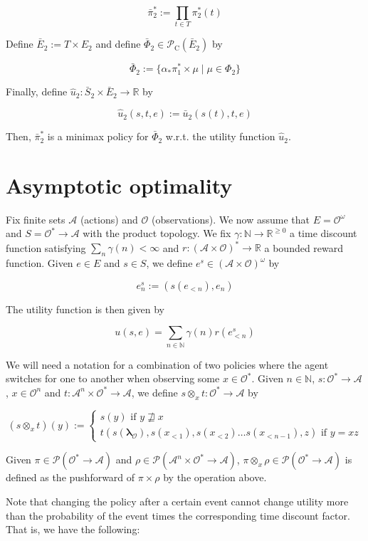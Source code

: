 \documentclass[a4paper]{article}
\newcommand{\Nats}{\mathbb{N}}
\newcommand{\Reals}{\mathbb{R}}
\newcommand{\Estr}{\bm{\lambda}}
\newcommand{\Prob}{\mathcal{P}}
\newcommand{\Act}{\mathcal{A}}
\newcommand{\Obs}{\mathcal{O}}
\newcommand{\ObsO}{\Obs^\omega}
\newcommand{\Pol}{\Obs^* \rightarrow \Act}
\newcommand{\CC}{\mathcal{P}_{\operatorname{C}}}
\begin{document}
$${\bar{\pi}_2^* := \prod_{t \in T} \pi_2^*(t)}$$

Define ${\bar{E}_2:=T \times E_2}$ and define ${\bar{\Phi}_2 \in \CC(\bar{E}_2)}$ by

$$\bar{\Phi}_2:=\{\alpha_* \pi_1^* \times \mu \mid \mu \in \Phi_2\}$$

Finally, define ${\hat{u}_2: \bar{S}_2 \times \bar{E}_2 \rightarrow \Reals}$ by

$$\hat{u}_2(s,t,e):=\bar{u}_2(s(t),t,e)$$

Then, ${\bar{\pi}_2^*}$ is a minimax policy for ${\bar{\Phi}_2}$ w.r.t. the utility function ${\hat{u}_2}$.

\section{Asymptotic optimality}

Fix finite sets ${\Act}$ (actions) and ${\Obs}$ (observations). We now assume that ${E=\ObsO}$ and ${S=\Pol}$ with the product topology. We fix ${\gamma: \Nats \rightarrow \Reals^{\geq 0}}$ a time discount function satisfying ${\sum_n \gamma(n) < \infty}$ and ${r: (\Act \times \Obs)^* \rightarrow \Reals}$ a bounded reward function. Given ${e \in E}$ and ${s \in S}$, we define ${e^s \in (\Act \times \Obs)^\omega}$ by

$${e^s_n:=(s(e_{<n}),e_n)}$$

The utility function is then given by

$$u(s,e)=\sum_{n \in \Nats} \gamma(n) r(e^s_{<n})$$

We will need a notation for a combination of two policies where the agent switches for one to another when observing some ${x \in \Obs^*}$. Given ${n \in \Nats}$, ${s: \Pol}$, ${x \in \Obs^n}$ and ${t: \Act^n \times \Pol}$, we define ${s \otimes_x t: \Pol}$ by

$$(s \otimes_x t)(y):=\begin{cases}s(y) \text{ if } y \not\sqsupseteq x \\t(s(\Estr_\Obs),s(x_{<1}), s(x_{<2}) \ldots s(x_{<{n-1}}),z) \text{ if } y=xz\end{cases}$$

Given ${\pi \in \Prob(\Pol)}$ and ${\rho \in \Prob(\Act^n \times \Pol)}$, ${\pi \otimes_x \rho \in \Prob(\Pol)}$ is defined as the pushforward of ${\pi \times \rho}$ by the operation above.

Note that changing the policy after a certain event cannot change utility more than the probability of the event times the corresponding time discount factor. That is, we have the following:
\end{document}
